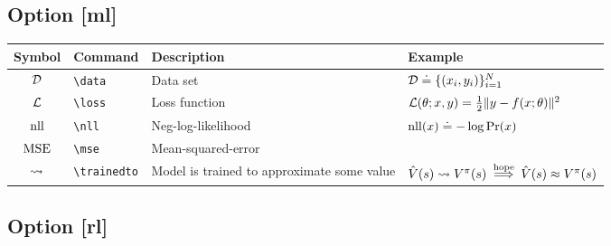 \documentclass{article}
\begin{document}
\subsection*{Option [ml]}

\begin{tabular}{clll}
  \toprule
  Symbol & Command & Description & Example \\
  \midrule
  ${\mathcal{D}}$ & \verb|\data| & Data set & ${\mathcal{D}} \doteq \{ (x_i, y_i) \}_{i=1}^N$ \\
  $\mathcal{L}$ & \verb|\loss| & Loss function & $\mathcal{L}(\theta; x, y) = \frac{1}{2} \| y - f(x; \theta) \|^2$ \\
  $\operatorname{nll}$ & \verb|\nll| & Neg-log-likelihood & $\operatorname{nll}(x) \doteq -\log\Pr(x)$ \\
  $\operatorname{MSE}$ & \verb|\mse| & Mean-squared-error & \\
  \midrule
  $\leadsto$ & \verb|\trainedto| & Model is trained to approximate some value & $\hat V(s) \leadsto V^{\pi}(s) \stackrel{\text{hope}}{\implies} \hat V(s) \approx V^{\pi}(s)$ \\
  \bottomrule
\end{tabular}

\subsection*{Option [rl]}
\end{document}
